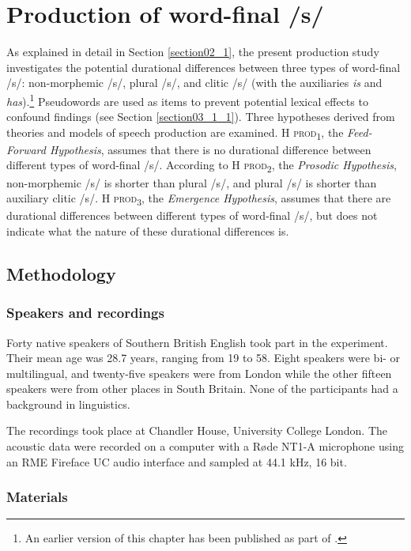 \chapter{Production of word-final /s/}\label{chapter04}

As explained in detail in Section \ref{section02_1}, the present production study investigates the potential durational differences between three types of word-final /s/: non-morphemic /s/, plural /s/, and clitic /s/ (with the auxiliaries \textit{is} and \textit{has}).\footnote{An earlier version of this chapter has been published as part of \citet{Schmitz2021a}.} Pseudowords are used as items to prevent potential lexical effects to confound findings (see Section \ref{section03_1_1}). Three hypotheses derived from theories and models of speech production are examined. \textsc{H prod\textsubscript{1}}, the \textit{Feed-Forward Hypothesis}, assumes that there is no durational difference between different types of word-final /s/. According to \textsc{H prod\textsubscript{2}}, the \textit{Prosodic Hypothesis}, non-morphemic /s/ is shorter than plural /s/, and plural /s/ is shorter than auxiliary clitic /s/. \textsc{H prod\textsubscript{3}}, the \textit{Emergence Hypothesis}, assumes that there are durational differences between different types of word-final /s/, but does not indicate what the nature of these durational differences is.

\section{Methodology}\label{section04_1}

\subsection{Speakers and recordings}\label{section04_1_1}

Forty native speakers of Southern British English took part in the experiment. Their mean age was 28.7 years, ranging from 19 to 58. Eight speakers were bi- or multilingual, and twenty-five speakers were from London while the other fifteen speakers were from other places in South Britain. None of the participants had a background in linguistics.

The recordings took place at Chandler House, University College London. The acoustic data were recorded on a computer with a Røde NT1-A microphone using an RME Fireface UC audio interface and sampled at 44.1 kHz, 16 bit.

\subsection{Materials}\label{section04_1_2}

